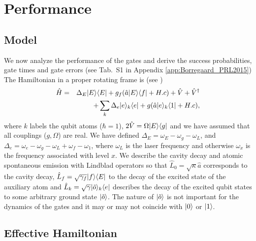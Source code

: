 \section{Performance}

\subsection{Model}
We now analyze the performance of the gates and derive the success
probabilities, gate times and gate errors (see Tab.~S1 in Appendix
\ref{app:Borregaard_PRL2015}) The Hamiltonian in a proper rotating frame is (see
)
\begin{eqnarray} 
\hat{H}&=&
\Delta_{E}| E \rangle
\langle E |+g_{f}(\hat{a}| E \rangle\langle f |+H.c)+\hat{V}+\hat{V}^{\dagger} \nonumber \\
&&+\sum_{k}\Delta_{e}| e \rangle_{k}\langle e |+g(\hat{a}| e \rangle_{k}\langle 1 |+H.c),
\end{eqnarray}          
where $k$ labels the qubit atoms ($\hbar=1$), $2\hat{V}=\Omega| E \rangle\langle g |$
and we have assumed that all couplings ($g,\Omega$) are real. We have defined
$\Delta_{E}=\omega_{E}-\omega_{g}-\omega_{L}$, and
$\Delta_{e}=\omega_{e}-\omega_{g}-\omega_{L}+\omega_{f}-\omega_{1}$, where
$\omega_{L}$ is the laser frequency and otherwise $\omega_{x}$ is the frequency
associated with level $x$. We describe the cavity decay and atomic spontaneous
emission with Lindblad operators so that $\hat{L}_{0}=\sqrt{\kappa}\hat{a}$
corresponds to the cavity decay,  $\hat{L}_{f}=\sqrt{\gamma_{f}}| f \rangle\langle E |$
to the decay of the excited state of the auxiliary atom and
$\hat{L}_{k}=\sqrt{\gamma}| \tilde{o} \rangle_{k}\langle e |$ describes the decay of the
excited qubit states to some arbitrary ground state $| \tilde{o} \rangle$. The
nature of $| \tilde{o} \rangle$ is not important for the dynamics of the gates and
it may or may not coincide with $| 0 \rangle$ or $| 1 \rangle$.

\subsection{Effective Hamiltonian}


